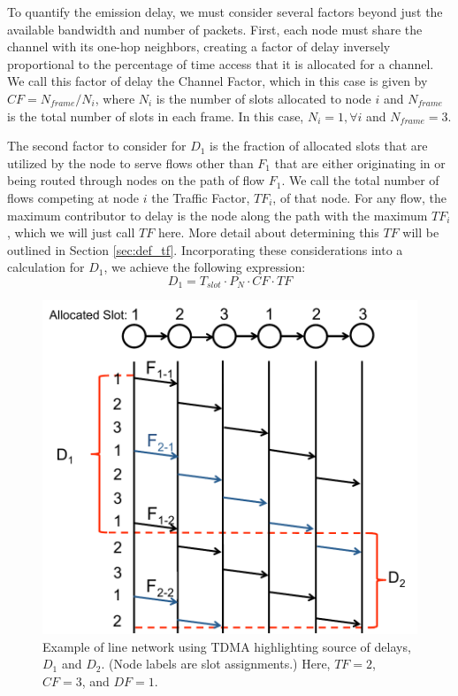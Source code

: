 To quantify the emission delay, we must consider several factors beyond just the available bandwidth and number of packets. First, each node must share the channel with its one-hop neighbors, creating a factor of delay inversely proportional to the percentage of time access that it is allocated for a channel. We call this factor of delay the Channel Factor, which in this case is given by $CF = N_{frame}/N_{i}$, where $N_{i}$ is the number of slots allocated to node $i$ and $N_{frame}$ is the total number of slots in each frame. In this case, $N_{i} = 1, \forall i$ and $N_{frame} = 3$. 

The second factor to consider for $D_1$ is the fraction of allocated slots that are utilized by the node to serve flows other than $F_1$ that are either originating in or being routed through nodes on the path of flow $F_1$.  We call the total number of flows competing at node $i$ the Traffic Factor, $TF_i$, of that node.  For any flow, the maximum contributor to delay is the node along the path with the maximum $TF_i$, which we will just call $TF$ here.  More detail about determining this $TF$ will be outlined in Section \ref{sec:def_tf}.  Incorporating these considerations into a calculation for $D_1$, we achieve the following expression:  %
\begin{equation}
	D_1 = T_{slot} \cdot P_N \cdot CF \cdot TF
\end{equation}

\begin{figure}
\begin{centering}
    \includegraphics[scale=0.33]{figures/delay_limit_expl/fig_1_2.pdf}
    \caption{Example of line network using TDMA highlighting source of delays, $D_1$ and $D_2$.  (Node labels are slot assignments.)  Here, $TF = 2$, $CF = 3$, and $DF = 1$. }
    \label{fig:delay_expl_fig_3}
\end{centering}
\end{figure}

